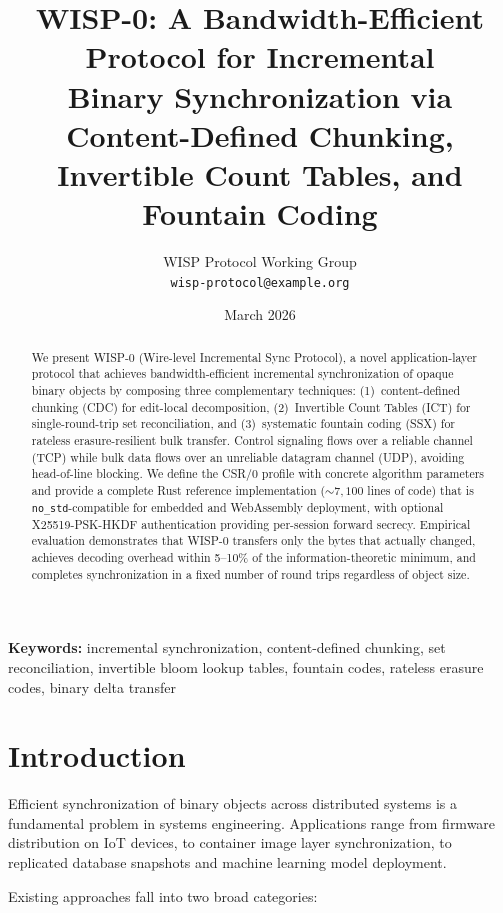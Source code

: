 \documentclass[11pt,twocolumn]{article}
\title{%
  WISP-0: A Bandwidth-Efficient Protocol for Incremental\\
  Binary Synchronization via Content-Defined Chunking,\\
  Invertible Count Tables, and Fountain Coding%
}
\author{%
  WISP Protocol Working Group\\
  \texttt{wisp-protocol@example.org}
}
\date{March 2026}
\theoremstyle{definition}
\begin{document}
\maketitle

\begin{abstract}
We present WISP-0 (Wire-level Incremental Sync Protocol), a novel
application-layer protocol that achieves bandwidth-efficient incremental
synchronization of opaque binary objects by composing three complementary
techniques: (1)~content-defined chunking (CDC) for edit-local decomposition,
(2)~Invertible Count Tables (ICT) for single-round-trip set reconciliation,
and (3)~systematic fountain coding (SSX) for rateless erasure-resilient
bulk transfer. Control signaling flows over a reliable channel (TCP) while
bulk data flows over an unreliable datagram channel (UDP), avoiding
head-of-line blocking. We define the CSR/0 profile with concrete algorithm
parameters and provide a complete Rust reference implementation
(${\sim}7{,}100$ lines of code) that is \texttt{no\_std}-compatible for
embedded and WebAssembly deployment, with optional X25519-PSK-HKDF
authentication providing per-session forward secrecy. Empirical evaluation
demonstrates that WISP-0 transfers only the bytes that actually changed,
achieves decoding overhead within 5--10\% of the information-theoretic
minimum, and completes synchronization in a fixed number of round trips
regardless of object size.
\end{abstract}

\textbf{Keywords:} incremental synchronization, content-defined chunking,
set reconciliation, invertible bloom lookup tables, fountain codes,
rateless erasure codes, binary delta transfer


\section{Introduction}
\label{sec:intro}

Efficient synchronization of binary objects across distributed systems is a
fundamental problem in systems engineering. Applications range from firmware
distribution on IoT devices, to container image layer synchronization, to
replicated database snapshots and machine learning model deployment.

Existing approaches fall into two broad categories:
\end{document}
